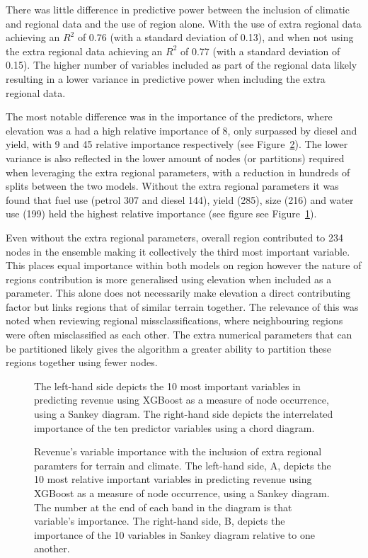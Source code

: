 \documentclass[review,12pt,authoryear]{elsarticle}
\begin{document}
\begin{linenumbers}
There was little difference in predictive power between the inclusion of climatic and regional data and the use of region alone. With the use of extra regional data achieving an $R^2$ of 0.76 (with a standard deviation of 0.13), and when not using the extra regional data achieving an $R^2$ of 0.77 (with a standard deviation of 0.15). The higher number of variables included as part of the regional data likely resulting in a lower variance in predictive power when including the extra regional data.
\par
The most notable difference was in the importance of the predictors, where elevation was a had a high relative importance of 8, only surpassed by diesel and yield, with 9 and 45 relative importance respectively (see Figure~\ref{fig:revenue_sankey_extra}). The lower variance is also reflected in the lower amount of nodes (or partitions) required when leveraging the extra regional parameters, with a reduction in hundreds of splits between the two models. Without the extra regional parameters it was found that fuel use (petrol 307 and diesel 144), yield (285), size (216) and water use (199) held the highest relative importance (see figure see Figure~\ref{fig:revenue_sankey}).
\par
Even without the extra regional parameters, overall region contributed to 234 nodes in the ensemble making it collectively the third most important variable. This places equal importance within both models on region however the nature of regions contribution is more generalised using elevation when included as a parameter. This alone does not necessarily make elevation a direct contributing factor but links regions that of similar terrain together. The relevance of this was noted when reviewing regional missclassifications, where neighbouring regions were often misclassified as each other. The extra numerical parameters that can be partitioned likely gives the algorithm a greater ability to partition these regions together using fewer nodes.

\begin{figure}[htb]
  \caption{The left-hand side depicts the 10 most important variables in predicting revenue using XGBoost as a measure of node occurrence, using a Sankey diagram. The right-hand side depicts the interrelated importance of the ten predictor variables using a chord diagram.}\label{fig:revenue_sankey}
\end{figure}

\begin{figure}[htb]
   \caption{Revenue's variable importance with the inclusion of extra regional paramters for terrain and climate. The left-hand side, A,  depicts the 10 most relative  important variables in predicting revenue using XGBoost as a measure of node occurrence, using a Sankey diagram. The number at the end of each band in the diagram is that variable's importance. The right-hand side, B, depicts the importance of the 10 variables in Sankey diagram relative to one another.}\label{fig:revenue_sankey_extra}
\end{figure}


\end{linenumbers}
\end{document}
